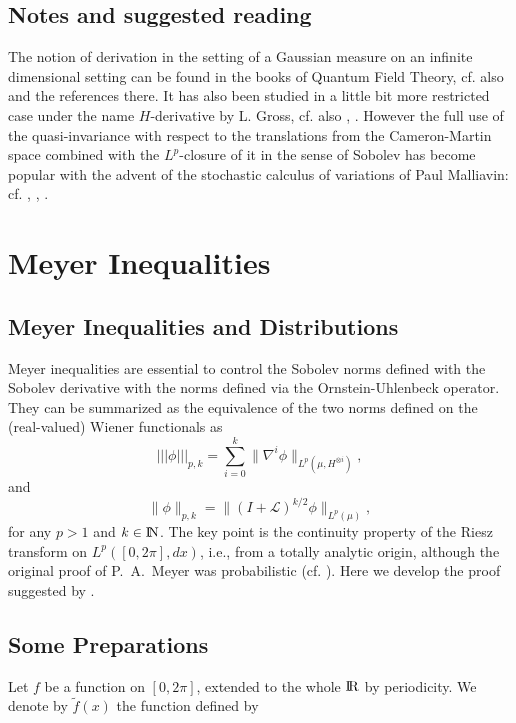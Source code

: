 \documentclass[12pt,a4paper]{book}
\newcommand{\R}{{\rm I\!R}}
\newcommand{\N}{{\rm I\!N}}
\begin{document}
\section*{Notes and suggested reading}
{\footnotesize{The notion of derivation in the setting of a Gaussian
  measure on an infinite dimensional setting can be found in the books
  of Quantum Field Theory, cf. \cite{Si}  also \cite{PK} and the references
  there. It has also been studied in a little bit more restricted case
  under the name $H$-derivative by L. Gross, cf. also \cite{KUO},
  \cite{PK}. However
  the full  use  of the quasi-invariance
  with respect to the translations from the Cameron-Martin space
  combined with the $L^p$-closure  of it in the sense of Sobolev has
  become popular with the advent of the stochastic calculus of
  variations of Paul Malliavin: cf. \cite{PAM}, \cite{Sh}, \cite{Mall-1}.}
}





\chapter{Meyer Inequalities}
\label{ch.meyer}
\section*{Meyer Inequalities and Distributions}

Meyer inequalities are essential to control the Sobolev norms defined with the
Sobolev derivative with the norms defined via the Ornstein-Uhlenbeck operator.
They can be summarized as the equivalence of the two  norms defined on
the (real-valued) Wiener functionals as
$$
|||\phi|||_{p,k}=\sum_{i=0}^{k}\|\nabla^i\phi\|_{L^p(\mu,H^{\otimes i})},
$$
and
$$
\|\phi\|_{p,k}=\|(I+{\mathcal L})^{k/2}\phi\|_{L^p(\mu)},
$$
for any $p>1$ and $k\in \N$.
The key point is the continuity property of the Riesz transform on
$L^p([0,2\pi],dx)$, i.e., from a totally analytic origin, although the original
proof of P.~A.~Meyer was probabilistic (cf. \cite{PAM}). Here we
develop  the proof suggested by \cite{F}.

\section{Some Preparations}
Let $f$ be a function on $[0,2\pi]$, extended  to the whole $\R$ by
periodicity. We denote by $\tilde{f}(x)$ the function defined by
\end{document}
